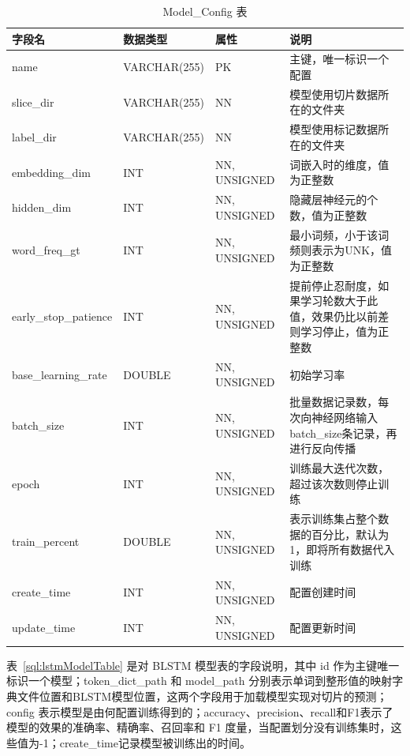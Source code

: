 \begin{table}[!htbp]\footnotesize %
	\centering
	\caption{Model\_Config 表}
	\vspace{2mm}
	\begin{tabular}{L{2.2cm}L{2cm}L{2.6cm}L{6cm}}
		\toprule
		\textbf{字段名}&\textbf{数据类型}&\textbf{属性}&\textbf{说明}\\
		\midrule
		name 						&VARCHAR(255)&PK&主键，唯一标识一个配置\\
		slice\_dir		 			&VARCHAR(255)&NN&模型使用切片数据所在的文件夹\\
		label\_dir		 			&VARCHAR(255)&NN&模型使用标记数据所在的文件夹\\
		embedding\_dim		  &INT&NN, UNSIGNED&词嵌入时的维度，值为正整数\\
		hidden\_dim				&INT&NN, UNSIGNED&隐藏层神经元的个数，值为正整数\\
		word\_freq\_gt			&INT&NN, UNSIGNED&最小词频，小于该词频则表示为UNK，值为正整数\\
		early\_stop\_patience		&INT&NN, UNSIGNED&提前停止忍耐度，如果学习轮数大于此值，效果仍比以前差则学习停止，值为正整数\\
		base\_learning\_rate		&DOUBLE&NN, UNSIGNED&初始学习率\\
		batch\_size					&INT&NN, UNSIGNED&批量数据记录数，每次向神经网络输入batch\_size条记录，再进行反向传播\\
		epoch						&INT&NN, UNSIGNED&训练最大迭代次数，超过该次数则停止训练\\
		train\_percent						&DOUBLE&NN, UNSIGNED&表示训练集占整个数据的百分比，默认为1，即将所有数据代入训练\\
		create\_time				&INT&NN, UNSIGNED&配置创建时间\\
		update\_time				&INT&NN, UNSIGNED&配置更新时间\\
		\bottomrule
	\end{tabular}
	\label{sql:modelConfigTable}
\end{table}

表~\ref{sql:lstmModelTable} 是对 BLSTM 模型表的字段说明，其中 id 作为主键唯一标识一个模型；token\_dict\_path 和 model\_path 分别表示单词到整形值的映射字典文件位置和BLSTM模型位置，这两个字段用于加载模型实现对切片的预测；config 表示模型是由何配置训练得到的；accuracy、precision、recall和F1表示了模型的效果的准确率、精确率、召回率和 F1 度量，当配置划分没有训练集时，这些值为-1；create\_time记录模型被训练出的时间。


